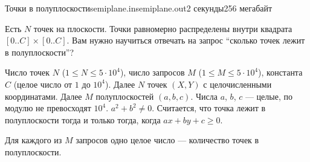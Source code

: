 
\begin{problem}{Точки в полуплоскости}{semiplane.in}{semiplane.out}{2 секунды}{256 мегабайт}{}

Есть $N$ точек на плоскости.
Точки равномерно распределены внутри квадрата $[0..C] \times [0..C]$.
Вам нужно научиться отвечать на запрос ``сколько точек лежит в полуплоскости''?

\InputFile

Число точек $N$ ($1 \le N \le 5 \cdot 10^4$), число запросов $M$ ($1 \le M \le 5 \cdot 10^4$),
константа $C$ (целое число от $1$ до $10^4$).
Далее $N$ точек $(X,Y)$ с целочисленными координатами.
Далее $M$ полуплоскостей $(a,b,c)$. Числа $a$, $b$, $c$ --- целые, по модулю не превосходят $10^4$. $a^2 + b^2 \not= 0$.
Считается, что точка лежит в полуплоскости тогда и только тогда, когда $ax + by + c \ge 0$.

\OutputFile

Для каждого из $M$ запросов одно целое число --- количество точек в полуплоскости.

\Example

\begin{example}
%
\end{example}

\end{problem}
